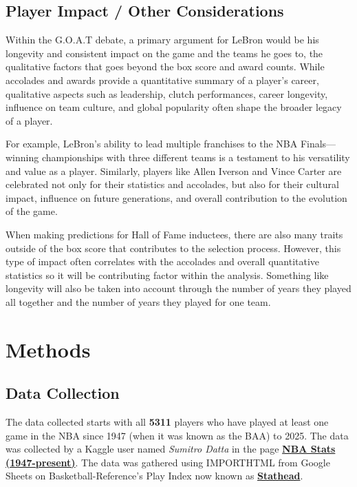 \documentclass[
  11pt,
]{article}
\begin{document}
\subsection{Player Impact / Other
Considerations}\label{player-impact-other-considerations}

Within the G.O.A.T debate, a primary argument for LeBron would be his
longevity and consistent impact on the game and the teams he goes to,
the qualitative factors that goes beyond the box score and award counts.
While accolades and awards provide a quantitative summary of a player's
career, qualitative aspects such as leadership, clutch performances,
career longevity, influence on team culture, and global popularity often
shape the broader legacy of a player.

For example, LeBron's ability to lead multiple franchises to the NBA
Finals---winning championships with three different teams is a testament
to his versatility and value as a player. Similarly, players like Allen
Iverson and Vince Carter are celebrated not only for their statistics
and accolades, but also for their cultural impact, influence on future
generations, and overall contribution to the evolution of the game.

When making predictions for Hall of Fame inductees, there are also many
traits outside of the box score that contributes to the selection
process. However, this type of impact often correlates with the
accolades and overall quantitative statistics so it will be contributing
factor within the analysis. Something like longevity will also be taken
into account through the number of years they played all together and
the number of years they played for one team.

\section{Methods}\label{methods}

\subsection{Data Collection}\label{data-collection}

The data collected starts with all \textbf{5311} players who have played
at least one game in the NBA since 1947 (when it was known as the BAA)
to 2025. The data was collected by a Kaggle user named \emph{Sumitro
Datta} in the page
\textbf{\href{https://www.kaggle.com/datasets/sumitrodatta/nba-aba-baa-stats?select=Player+Career+Info.csv}{NBA
Stats (1947-present)}}. The data was gathered using IMPORTHTML from
Google Sheets on Basketball-Reference's Play Index now known as
\textbf{\href{https://stathead.com/}{Stathead}}.
\end{document}
